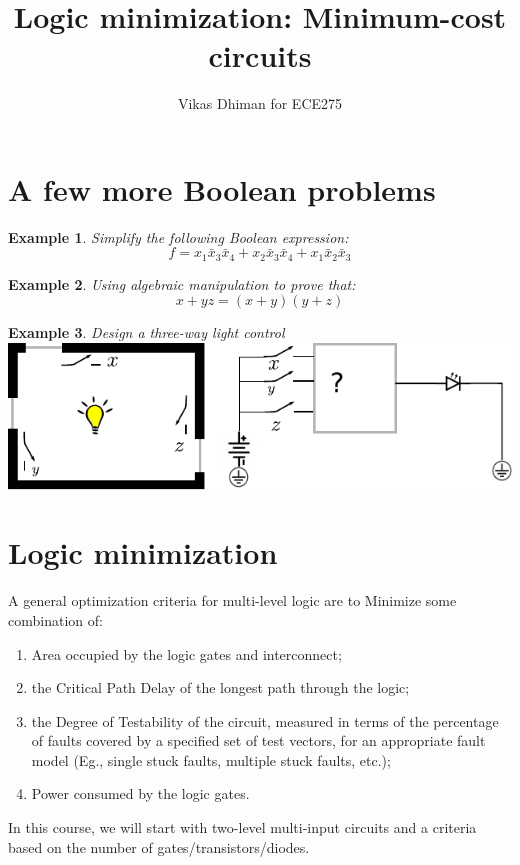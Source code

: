 \documentclass{article}
\title{Logic minimization: Minimum-cost circuits}
\author{Vikas Dhiman for ECE275}
\newtheorem{example}{Example}
\newcommand{\bx}{\bar{x}}
\begin{document}
\maketitle

\section{A few more Boolean problems}
\begin{example}
  Simplify the following Boolean expression:
  \[ f = x_1\bx_3 \bx_4 + x_2 \bx_3 \bx_4 + x_1 \bx_2 \bx_3 \]
\end{example}

\begin{example}
  Using algebraic manipulation to prove that:
  \[ x + yz = (x + y)(y+z) \]
\end{example}

\begin{example}
  Design a three-way light control
  \includegraphics[width=\linewidth]{figures/design-a-3-way-light-switch.pdf}
\end{example}

\section{Logic minimization}

A general optimization criteria for multi-level logic are to Minimize
some combination of:
\begin{enumerate}
\item Area occupied by the logic gates and interconnect;
\item the Critical Path Delay of the longest path through the logic;
\item the Degree of Testability of the circuit, measured in terms of the percentage
of faults covered by a specified set of test vectors, for an appropriate fault model
(Eg., single stuck faults, multiple stuck faults, etc.);
\item Power consumed by the logic gates.
\end{enumerate}

In this course, we will start with two-level multi-input circuits and a criteria
based on the number of gates/transistors/diodes.
\end{document}
